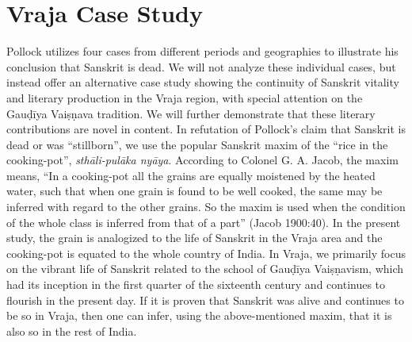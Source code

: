 \section*{Vraja Case Study}

Pollock utilizes four cases from different periods and geographies to illustrate his conclusion that Sanskrit is dead. We will not analyze these individual cases, but instead offer an alternative case study showing the continuity of Sanskrit vitality and literary production in the Vraja region, with special attention on the Gauḍīya Vaiṣṇava tradition. We will further demonstrate that these literary contributions are novel in content. In refutation of Pollock’s claim that Sanskrit is dead or was “stillborn”, we use the popular Sanskrit maxim of the “rice in the cooking-pot”, {\sl sthāli-pulāka nyāya}. According to Colonel G. A. Jacob, the maxim means, “In a cooking-pot all the grains are equally moistened by the heated water, such that when one grain is found to be well cooked, the same may be inferred with regard to the other grains. So the maxim is used when the condition of the whole class is inferred from that of a part” (Jacob 1900:40). In the present study, the grain is analogized to the life of Sanskrit in the Vraja area and the cooking-pot is equated to the whole country of India. In Vraja, we primarily focus on the vibrant life of Sanskrit related to the school of Gauḍīya Vaiṣṇavism, which had its inception in the first quarter of the sixteenth century and continues to flourish in the present day. If it is proven that Sanskrit was alive and continues to be so in Vraja, then one can infer, using the above-mentioned maxim, that it is also so in the rest of India. 

